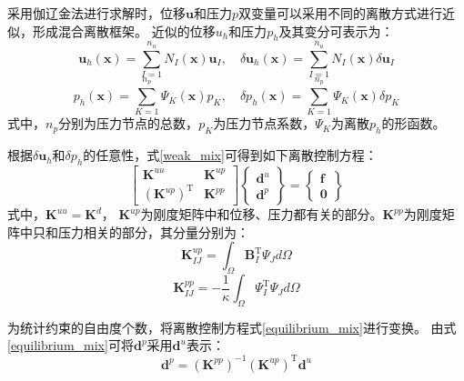 采用伽辽金法进行求解时，位移$\boldsymbol u$和压力$p$双变量可以采用不同的离散方式进行近似，形成混合离散框架。
近似的位移$u_h$和压力$p_h$及其变分可表示为：
\begin{equation}\label{u_h_mix}
    \boldsymbol u_h(\boldsymbol x) = \sum_{I=1}^{n_u} N_I(\boldsymbol x) \boldsymbol u_I, \quad
    \delta \boldsymbol u_h(\boldsymbol x) = \sum_{I=1}^{n_u} N_I(\boldsymbol x) \delta \boldsymbol u_I
\end{equation}
\begin{equation}\label{p_h_mix}
    p_h(\boldsymbol x) = \sum_{K=1}^{n_p} \Psi_K(\boldsymbol x) p_K, \quad
    \delta p_h(\boldsymbol x) = \sum_{K=1}^{n_p} \Psi_K(\boldsymbol x) \delta p_K
\end{equation}
式中，$n_p$分别为压力节点的总数，$p_K$为压力节点系数，$\Psi_K$为离散$p_h$的形函数。

根据$\delta \boldsymbol  u_h$和$\delta p_h$的任意性，式\eqref{weak_mix}可得到如下离散控制方程：
\begin{equation}\label{equilibrium_mix}
    \begin{bmatrix}
        \boldsymbol K^{uu} & \boldsymbol K^{up} \\ (\boldsymbol K^{up})^{\mathrm T} & \boldsymbol K^{pp}
    \end{bmatrix}
    \begin{Bmatrix}
        \boldsymbol d^u \\ \boldsymbol d^p 
    \end{Bmatrix} =
    \begin{Bmatrix}
        \boldsymbol f \\ \boldsymbol 0 
    \end{Bmatrix}
\end{equation}
式中，$\boldsymbol K^{uu} = \boldsymbol K^d$， $\boldsymbol{K}^{up}$为刚度矩阵中和位移、压力都有关的部分。$\boldsymbol{K}^{pp}$为刚度矩阵中只和压力相关的部分，其分量分别为：
\begin{equation}
    \boldsymbol{K}^{up}_{I J}=\int_{\Omega} \boldsymbol B_{I}^{\mathrm T} \Psi_{J} {d} \Omega
\end{equation}
\begin{equation}  
    \boldsymbol{K}^{pp}_{IJ}=-\frac{1}{\kappa}\int_{\Omega}  \Psi^\mathrm{T}_{I}  \Psi_{J}d\Omega
\end{equation}

为统计约束的自由度个数，将离散控制方程式\eqref{equilibrium_mix}进行变换。
由式\eqref{equilibrium_mix}可将$\boldsymbol d^p$采用$\boldsymbol d^u$表示：
\begin{equation}
    \boldsymbol d^p = (\boldsymbol K^{pp})^{-1} (\boldsymbol K^{up})^{\mathrm T} \boldsymbol d^u
\end{equation}

